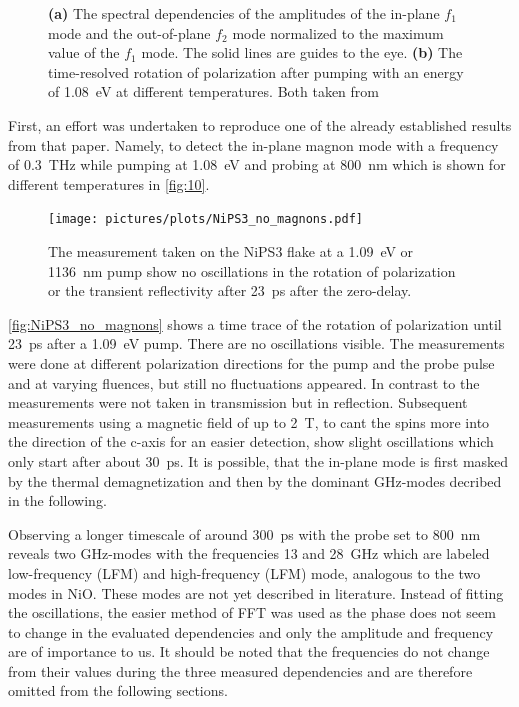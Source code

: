 \begin{figure}[ht]
\begin{subfigure}[b]{0.28\textwidth}
        \caption{}
        \label{fig:10}
    \end{subfigure}
    \caption{\textbf{(a)} The spectral dependencies of the amplitudes of the in-plane $f_1$ mode and the out-of-plane $f_2$ mode normalized to the maximum value of the $f_1$ mode. The solid lines are guides to the eye. \textbf{(b)} The time-resolved rotation of polarization after pumping with an energy of \qty{1.08}{eV} at different temperatures. Both taken from }
\end{figure}
\FloatBarrier
First, an effort was undertaken to reproduce one of the already established results from that paper.
Namely, to detect the in-plane magnon mode with a frequency of \qty{0.3}{THz} while pumping at \qty{1.08}{eV} and probing at \qty{800}{nm} which is shown for different temperatures in \autoref{fig:10}.
\begin{figure}[ht]
    \centering
    \texttt{[image: pictures/plots/NiPS3\_no\_magnons.pdf]} \vspace{-0.3cm}
    \caption{The measurement taken on the NiPS3 flake at a \qty{1.09}{eV} or \qty{1136}{nm} pump show no oscillations in the rotation of polarization or the transient reflectivity after \qty{23}{ps} after the zero-delay.}
    \label{fig:NiPS3_no_magnons}
\end{figure}
\FloatBarrier
\autoref{fig:NiPS3_no_magnons} shows a time trace of the rotation of polarization until \qty{23}{ps} after a \qty{1.09}{eV} pump.
There are no oscillations visible.
The measurements were done at different polarization directions for the pump and the probe pulse and at varying fluences, but still no fluctuations appeared.
In contrast to  the measurements were not taken in transmission but in reflection.
Subsequent measurements using a magnetic field of up to \qty{2}{T}, to cant the spins more into the direction of the c-axis for an easier detection, show slight oscillations which only start after about \qty{30}{ps}.
It is possible, that the in-plane mode is first masked by the thermal demagnetization and then by the dominant GHz-modes decribed in the following.

Observing a longer timescale of around \qty{300}{ps} with the probe set to \qty{800}{nm} reveals two GHz-modes with the frequencies 13 and \qty{28}{GHz} which are labeled low-frequency (LFM) and high-frequency (LFM) mode, analogous to the two modes in NiO.
These modes are not yet described in literature.
Instead of fitting the oscillations, the easier method of FFT was used as the phase does not seem to change in the evaluated dependencies and only the amplitude and frequency are of importance to us.
It should be noted that the frequencies do not change from their values during the three measured dependencies and are therefore omitted from the following sections.

